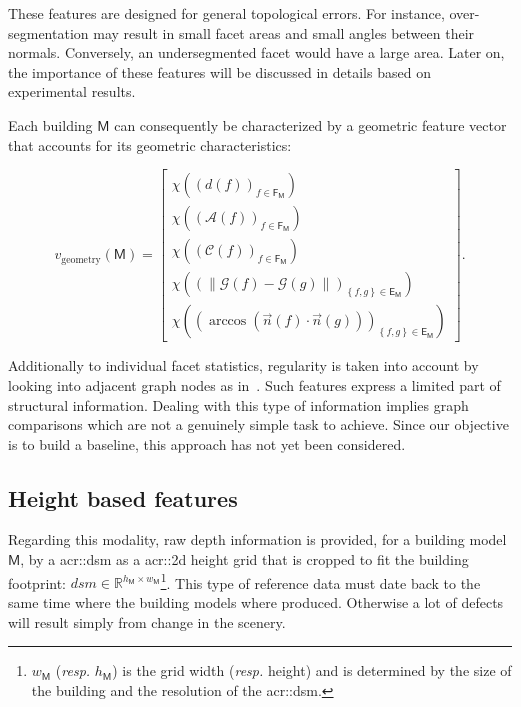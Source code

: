        These features are designed for general topological errors.
        For instance, over-segmentation may result in small facet areas and small angles between their normals.
        Conversely, an undersegmented facet would have a large area.
        Later on, the importance of these features will be discussed in details based on experimental results.
        
        Each building $\mathsf{M}$ can consequently be characterized by a geometric feature vector that accounts for its geometric characteristics:

        \begin{equation}
        	\label{eq::geometric_baseline_features}
            v_{\text{geometry}}(\mathsf{M}) = \begin{bmatrix}
            	\chi \left(\left(d\left(f\right)\right)_{f \in \mathsf{F_M}}\right)\\
                \chi \left(\left(\mathscr{A}\left(f\right)\right)_{f \in \mathsf{F_M}}\right)\\
                \chi \left(\left(\mathscr{C}\left(f\right)\right)_{f \in \mathsf{F_M}}\right)\\
                \chi \left(\left( \left\lVert \mathscr{G}\left(f\right) - \mathscr{G}\left(g\right) \right\rVert \right)_{\left\{f, g\right\} \in \mathsf{E_M}}\right)\\
                \chi \left(\left( \arccos\left(\vec{n}\left(f\right) \cdot \vec{n}\left(g\right)\right) \right)_{\left\{f, g\right\} \in \mathsf{E_M}}\right)
            \end{bmatrix}.
        \end{equation}

        Additionally to individual facet statistics, regularity is taken into account by looking into adjacent graph nodes as in~\parencite{zhou20102}.
        Such features express a limited  part of structural information.
        Dealing with this type of information implies graph comparisons which are not a genuinely simple task to achieve.
        Since our objective is to build a baseline, this approach has not yet been considered.

    \subsection{Height based features}
        \label{subsec::learned_evaluation::baseline::height}
        Regarding this modality, raw depth information is provided, for a building model \(\mathsf{M}\), by a \gls{acr::dsm} as a \gls{acr::2d} height grid that is cropped to fit the building footprint: $dsm \in \mathbb{R}^{h_{\mathsf{M}} \times w_{\mathsf{M}}}$\footnote{\label{note::w_h}\(w_{\mathsf{M}}\) (\textit{resp.} \(h_{\mathsf{M}}\)) is the grid width (\textit{resp.} height) and is determined by the size of the building and the resolution of the \gls{acr::dsm}.}.
        This type of reference data must date back to the same time where the building models where produced.
        Otherwise a lot of defects will result simply from change in the scenery.\\
        
